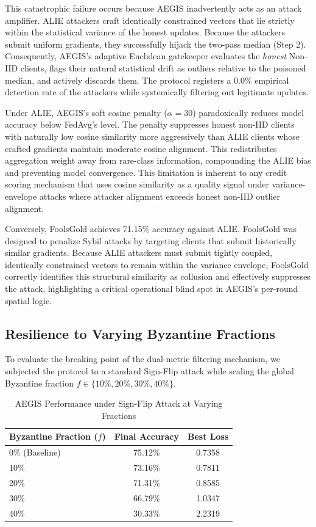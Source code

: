 \documentclass[10pt, conference]{IEEEtran}
\begin{document}
This catastrophic failure occurs because AEGIS inadvertently acts as an attack amplifier. ALIE attackers craft identically constrained vectors that lie strictly within the statistical variance of the honest updates. Because the attackers submit uniform gradients, they successfully hijack the two-pass median (Step 2). Consequently, AEGIS's adaptive Euclidean gatekeeper evaluates the \textit{honest} Non-IID clients, flags their natural statistical drift as outliers relative to the poisoned median, and actively discards them. The protocol registers a 0.0\% empirical detection rate of the attackers while systemically filtering out legitimate updates.

Under ALIE, AEGIS's soft cosine penalty ($\alpha = 30$) paradoxically reduces model accuracy below FedAvg's level. The penalty suppresses honest non-IID clients with naturally low cosine similarity more aggressively than ALIE clients whose crafted gradients maintain moderate cosine alignment. This redistributes aggregation weight away from rare-class information, compounding the ALIE bias and preventing model convergence. This limitation is inherent to any credit scoring mechanism that uses cosine similarity as a quality signal under variance-envelope attacks where attacker alignment exceeds honest non-IID outlier alignment.

Conversely, FoolsGold achieves 71.15\% accuracy against ALIE. FoolsGold was designed to penalize Sybil attacks by targeting clients that submit historically similar gradients. Because ALIE attackers must submit tightly coupled, identically constrained vectors to remain within the variance envelope, FoolsGold correctly identifies this structural similarity as collusion and effectively suppresses the attack, highlighting a critical operational blind spot in AEGIS's per-round spatial logic.

\subsection{Resilience to Varying Byzantine Fractions}
To evaluate the breaking point of the dual-metric filtering mechanism, we subjected the protocol to a standard Sign-Flip attack while scaling the global Byzantine fraction $f \in \{10\%, 20\%, 30\%, 40\%\}$.

\begin{table}[htbp]
\centering
\caption{AEGIS Performance under Sign-Flip Attack at Varying Fractions}
\begin{tabular}{@{}lcc@{}}
\toprule
\textbf{Byzantine Fraction ($f$)} & \textbf{Final Accuracy} & \textbf{Best Loss} \\ \midrule
0\% (Baseline) & 75.12\% & 0.7358 \\
10\% & 73.16\% & 0.7811 \\
20\% & 71.31\% & 0.8585 \\
30\% & 66.79\% & 1.0347 \\
40\% & 30.33\% & 2.2319 \\ \bottomrule
\end{tabular}
\label{tab:fractions}
\end{table}
\end{document}

